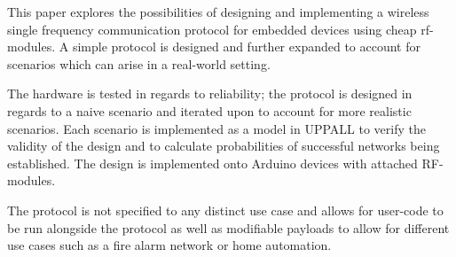 This paper explores the possibilities of designing and implementing a wireless single frequency communication protocol for embedded devices using cheap \acrshort{rf}-modules.
A simple protocol is designed and further expanded to account for scenarios which can arise in a real-world setting.

\medskip
The hardware is tested in regards to reliability; the protocol is designed in regards to a naive scenario and iterated upon to account for more realistic scenarios.
Each scenario is implemented as a model in UPPALL to verify the validity of the design and to calculate probabilities of successful networks being established.
The design is implemented onto Arduino devices with attached RF-modules.

\medskip
The protocol is not specified to any distinct use case and allows for user-code to be run alongside the protocol as well as modifiable payloads to allow for different use cases such as a fire alarm network or home automation. 